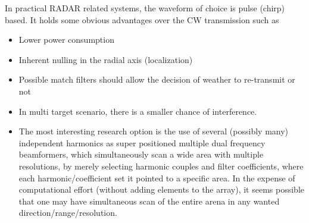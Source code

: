 In practical RADAR related systems, the waveform of choice is pulse (chirp) based.
It holds some obvious advantages over the CW transmission such as
\begin{itemize}
    \item Lower power consumption
    \item Inherent nulling in the radial axis (localization)
    \item Possible match filters should allow the decision of weather to re-transmit or not
    \item In multi target scenario, there is a smaller chance of interference.
    \item The most interesting research option is the use of several (possibly many) independent harmonics as super positioned multiple dual frequency beamformers, which simultaneously scan a wide area with multiple resolutions, by merely selecting harmonic couples and filter coefficients, where each harmonic/coefficient set it pointed to a specific area.
    In the expense of computational effort (without adding elements to the array), it seems possible that one may have simultaneous scan of the entire arena in any wanted direction/range/resolution.
\end{itemize}